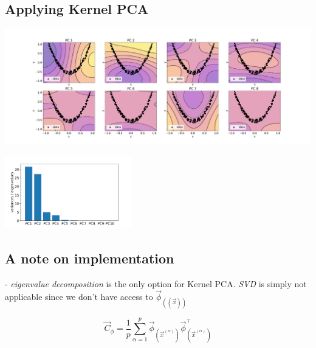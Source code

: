 

\subsection{Applying Kernel PCA}

\begin{frame}{\subsecname}


\begin{center}
	\includegraphics[height=5cm]{img/contourplot_kpca_rbf}
\end{center}
\svspace{-0.8cm}
\begin{center}
	\includegraphics[height=3.2cm]{img/screeplot_kpca_rbf.pdf}
\end{center}

\end{frame}

\subsection{A note on implementation}

\begin{frame}{\subsecname}



\pause

- \emph{eigenvalue decomposition} is the only option for Kernel PCA. \emph{SVD} is simply not applicable since we don't have access to $\vec \phi_{((\vec x))}$

\begin{equation}
\vec C_{\phi} = \frac{1}{p} \sum_{\alpha=1}^{p} \vec{\phi}_{(\vec{x}^{(\alpha)})} \vec{\phi}^{\top}_{(\vec{x}^{(\alpha)})}
\end{equation}

\end{frame}

